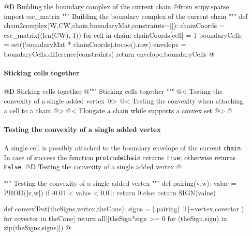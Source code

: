 \documentclass[11pt,oneside]{article}	%
\begin{document}
@D Building the boundary complex of the current chain
@{from scipy.sparse import csc_matrix
""" Building the boundary complex of the current chain """
def chain2complex(W,CW,chain,boundaryMat,constraints=[]):
	chainCoords = csc_matrix((len(CW), 1))
	for cell in chain: chainCoords[cell] = 1
	boundaryCells = set((boundaryMat * chainCoords).tocoo().row)
	envelope = boundaryCells.difference(constraints)
	return envelope,boundaryCells
@}



\paragraph{Sticking cells together}
@D Sticking cells together
@{""" Sticking cells together """
@< Testing the convexity of a single added vertex @>
@< Testing the convexity when attaching a cell to a chain @>
@< Elongate a chain while supports a convex set @>
@}

\paragraph{Testing the convexity of a single added vertex}
A single cell is possibly attached to the boundary envelope of the current \texttt{chain}. In case of success
the function \texttt{protrudeChain} returns \texttt{True}; otherwise returns \texttt{False}. 
@D Testing the convexity of a single added vertex
@{""" Testing the convexity of a single added vertex """
def pairing(v,w):
	value = PROD([v,w])
	if -0.01 < value < 0.01: return 0
	else: return SIGN(value)

def convexTest(theSigns,vertex,theCone):
	signs = [ pairing( [1]+vertex,covector ) for covector in theCone]
	return all([theSign*sign >= 0 for (theSign,sign) in zip(theSigns,signs)])
@}
\end{document}
